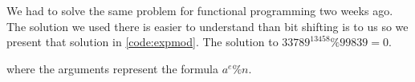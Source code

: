 We had to solve the same problem for functional programming two weeks ago. The solution we used there is easier to understand than bit shifting is to us so we present that solution in \autoref{code:expmod}. The solution to $33789^{13458} \% 99839 = 0$.

where the arguments represent the formula $a^e \% n$.